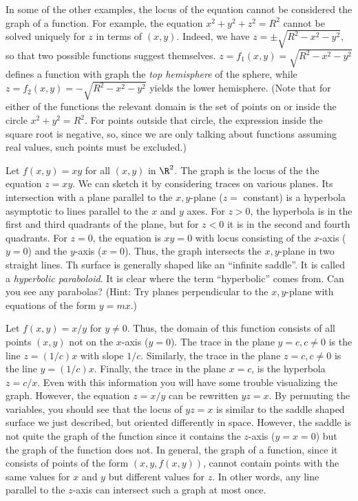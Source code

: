 In some of the other examples, the locus
of the equation cannot be considered the graph of a function.
For example, the equation $x^2 + y^2 + z^2 = R^2$ cannot be solved
uniquely for $z$ in terms of $(x,y)$.  Indeed, we have
$z = \pm\sqrt{R^2 - x^2 - y^2}$, so that two possible functions
suggest themselves.  $z = f_1(x,y) = \sqrt{R^2 - x^2 - y^2}$ 
defines a function with graph
the {\it top hemisphere\/} of the sphere, while $z = f_2(x,y)
= - \sqrt{R^2 - x^2 - y^2}$ yields the lower hemisphere.  (Note that
for either of the functions the relevant domain is the set of
points on or inside the circle $x^2 + y^2 = R^2$.  For points outside
that circle, the expression inside the square root is negative, so,
since we are only talking about functions assuming real values,
such points must be excluded.)

\smallskip
\nextex
{}
Let $f(x,y) = xy$ for all $(x,y)$ in $\R^2$.    The graph is the
locus of the the equation $z = xy$.  We can sketch it by considering
traces on various planes.  Its intersection with a plane parallel
to the $x,y$-plane ($z =$ constant) is a hyperbola asymptotic to
lines parallel to the $x$ and $y$ axes.   For $z > 0$, the hyperbola
is in the first and third quadrants of the plane, but for
$z < 0$ it is in the second and fourth quadrants.  For $z = 0$,
the equation is $xy = 0$ with locus consisting of the $x$-axis
($y = 0$) and the $y$-axis ($x = 0$).   Thus, the graph intersects
the $x,y$-plane in two straight lines.  Th surface is generally
shaped like an ``infinite saddle''.  It is called a {\it hyperbolic
paraboloid}.  It is clear where the term ``hyperbolic'' comes from.
Can you see any parabolas?  (Hint: Try planes perpendicular to
the $x,y$-plane with equations of the form  $y = mx$.)
\endexample
\centerline{}
\medskip
\nextex
{}
 Let $f(x,y) = x/y$ for $y \not= 0$.  Thus, the domain of this
function consists of all points $(x,y)$ not on the $x$-axis
($y = 0$).
The trace in the plane $y = c, c \not= 0$ is the line $z = (1/c)x$
with slope $1/c$.   Similarly, the trace in the plane $z = c, c \not=0$
is the line $y = (1/c)x$.  Finally, the trace in the plane $x = c$,
is the hyperbola $z = c/x$.  Even with this information you will have
some trouble visualizing the graph.   However, the equation
$z = x/y$ can be rewritten $yz = x$.   By permuting the variables,
you should see that the locus of $yz = x$
 is similar to the  saddle shaped surface
we just described, but oriented differently in space.  However,
 the saddle
is not quite the graph of the function since it  contains the 
 $z$-axis ($y = x = 0$) but the graph of the function does not.
In general, the graph of a function, since it consists of points
of the form $(x,y,f(x,y))$, cannot contain points with the same
values for $x$ and $y$ but different values for $z$.  In other words,
any line parallel to the $z$-axis can intersect such a graph at most
once. 
\endexample

